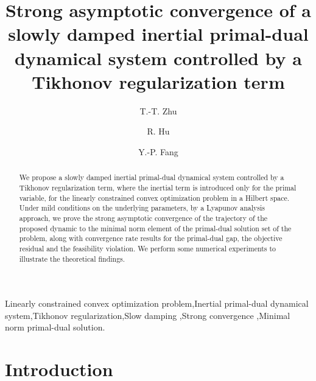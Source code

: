 \documentclass[review]{elsarticle}
\begin{document}
	\begin{frontmatter}
		
		\title{ Strong asymptotic convergence of a slowly damped inertial primal-dual dynamical system controlled by a Tikhonov regularization term }
		
		
		\author[mymainaddress]{T.-T. Zhu}
		
		\author[mysecondaryaddress]{R. Hu}
		
		\author[mymainaddress]{Y.-P. Fang}
		
		\address[mymainaddress]{Department of Mathematics, Sichuan University, Chengdu, Sichuan, P.R. China}
		\address[mysecondaryaddress]{Department of Applied Mathematics, Chengdu University of Information Technology, Chengdu, Sichuan, P.R. China}
		
		\begin{abstract}
			We propose a slowly damped inertial primal-dual dynamical system controlled by a  Tikhonov regularization term, where the inertial term is introduced only for the primal variable,  for the linearly constrained convex optimization problem in a Hilbert space. Under mild conditions on the underlying parameters, by  a Lyapunov analysis approach, we prove the strong asymptotic convergence of  the trajectory of the proposed dynamic  to the minimal norm element of the  primal-dual solution set of the  problem, along with convergence rate results for  the primal-dual gap, the objective residual and the feasibility violation. We perform some numerical experiments to illustrate the theoretical findings.
		\end{abstract}
		
		\begin{keyword}
		 Linearly constrained convex optimization problem\sep  Inertial primal-dual dynamical system\sep Tikhonov regularization\sep Slow damping \sep Strong convergence \sep Minimal norm primal-dual solution.				
		\end{keyword}		
	\end{frontmatter}
	
	\section{Introduction} 
\end{document}
